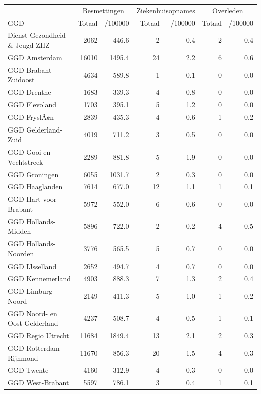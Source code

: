 \documentclass[
  english,
  man,floatsintext]{apa6}
\begin{document}
\begin{table}
\centering\begingroup\fontsize{10}{12}\selectfont

\begin{threeparttable}
\begin{tabular}{lrrrrrr}
\toprule
\multicolumn{1}{c}{ } & \multicolumn{2}{c}{Besmettingen} & \multicolumn{2}{c}{Ziekenhuisopnames} & \multicolumn{2}{c}{Overleden} \\
\cmidrule(l{3pt}r{3pt}){2-3} \cmidrule(l{3pt}r{3pt}){4-5} \cmidrule(l{3pt}r{3pt}){6-7}
GGD & Totaal & /100000 & Totaal & /100000 & Totaal & /100000\\
\midrule
Dienst Gezondheid \& Jeugd ZHZ & 2062 & 446.6 & 2 & 0.4 & 2 & 0.4\\
GGD Amsterdam & 16010 & 1495.4 & 24 & 2.2 & 6 & 0.6\\
GGD Brabant-Zuidoost & 4634 & 589.8 & 1 & 0.1 & 0 & 0.0\\
GGD Drenthe & 1683 & 339.3 & 4 & 0.8 & 0 & 0.0\\
GGD Flevoland & 1703 & 395.1 & 5 & 1.2 & 0 & 0.0\\
GGD FryslÃ¢n & 2839 & 435.3 & 4 & 0.6 & 1 & 0.2\\
GGD Gelderland-Zuid & 4019 & 711.2 & 3 & 0.5 & 0 & 0.0\\
GGD Gooi en Vechtstreek & 2289 & 881.8 & 5 & 1.9 & 0 & 0.0\\
GGD Groningen & 6055 & 1031.7 & 2 & 0.3 & 0 & 0.0\\
GGD Haaglanden & 7614 & 677.0 & 12 & 1.1 & 1 & 0.1\\
GGD Hart voor Brabant & 5972 & 552.0 & 6 & 0.6 & 0 & 0.0\\
GGD Hollands-Midden & 5896 & 722.0 & 2 & 0.2 & 4 & 0.5\\
GGD Hollands-Noorden & 3776 & 565.5 & 5 & 0.7 & 0 & 0.0\\
GGD IJsselland & 2652 & 494.7 & 4 & 0.7 & 0 & 0.0\\
GGD Kennemerland & 4903 & 888.3 & 7 & 1.3 & 2 & 0.4\\
GGD Limburg-Noord & 2149 & 411.3 & 5 & 1.0 & 1 & 0.2\\
GGD Noord- en Oost-Gelderland & 4237 & 508.7 & 4 & 0.5 & 1 & 0.1\\
GGD Regio Utrecht & 11684 & 1849.4 & 13 & 2.1 & 2 & 0.3\\
GGD Rotterdam-Rijnmond & 11670 & 856.3 & 20 & 1.5 & 4 & 0.3\\
GGD Twente & 4160 & 312.9 & 4 & 0.3 & 0 & 0.0\\
GGD West-Brabant & 5597 & 786.1 & 3 & 0.4 & 1 & 0.1\\

\end{tabular}
\end{threeparttable}
\end{table}
\end{document}
